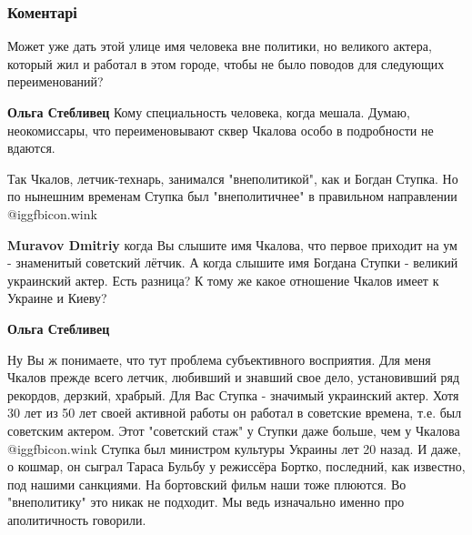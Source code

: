  
 
 
 
 
\subsubsection{Коментарі}
\label{sec:10_11_2021.fb.fb_group.story_kiev_ua.1.chkalov_skver_kiev.cmt}

\begin{itemize} %

Может уже дать этой улице имя человека вне политики, но великого актера,
который жил и работал в этом городе, чтобы не было поводов для следующих
переименований?

\begin{itemize} %
\textbf{Ольга Стебливец} Кому специальность человека, когда мешала. Думаю, неокомиссары, что переименовывают сквер Чкалова особо в подробности не вдаются.


Так Чкалов, летчик-технарь, занимался "внеполитикой", как и Богдан Ступка. Но
по нынешним временам Ступка был "внеполитичнее" в правильном направлении  @igg{fbicon.wink} 

\begin{itemize} %
\textbf{Muravov Dmitriy} когда Вы слышите имя Чкалова, что первое приходит на ум - знаменитый советский лётчик.
А когда слышите имя Богдана Ступки - великий украинский актер. Есть разница?
К тому же какое отношение Чкалов имеет к Украине и Киеву?

\textbf{Ольга Стебливец} 

Ну Вы ж понимаете, что тут проблема субъективного восприятия. Для меня Чкалов
прежде всего летчик, любивший и знавший свое дело, установивший ряд рекордов,
дерзкий, храбрый. Для Вас Ступка - значимый украинский актер. Хотя 30 лет из 50
лет своей активной работы он работал в советские времена, т.е. был советским
актером. Этот "советский стаж" у Ступки даже больше, чем у Чкалова  @igg{fbicon.wink}  Ступка
был министром культуры Украины лет 20 назад. И даже, о кошмар, он сыграл Тараса
Бульбу у режиссёра Бортко, последний, как известно, под нашими санкциями. На
бортовский фильм наши тоже плюются. Во "внеполитику" это никак не подходит. Мы
ведь изначально именно про аполитичность говорили.


\end{itemize}
\end{itemize}
\end{itemize}
